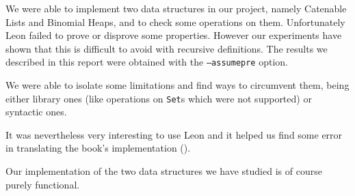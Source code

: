We were able to implement two data structures in our project,
namely Catenable Lists and Binomial Heaps,
and to check some operations on them.
Unfortunately Leon failed to prove or disprove some properties. 
However our experiments have shown 
that this is difficult to avoid with recursive definitions.
The results we described in this report were obtained with the \texttt{--assumepre} option.

We were able to isolate some limitations and find ways to circumvent them, 
being either library ones (like operations on \texttt{Set}s which were not supported) 
or syntactic ones.

It was nevertheless very interesting to use Leon and it helped us find some error 
in translating the book's implementation (\citep{Okasaki}). 

Our implementation of the two data structures we have studied is of course purely functional.